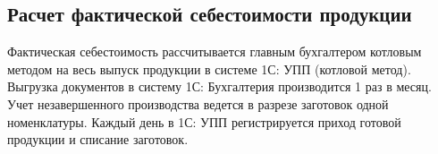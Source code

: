  \newpage
\subsection{Расчет фактической себестоимости продукции}
Фактическая себестоимость рассчитывается главным бухгалтером котловым методом на весь выпуск продукции в системе 1С: УПП (котловой метод). Выгрузка документов в систему 1С: Бухгалтерия производится 1 раз в месяц.
Учет незавершенного производства ведется в разрезе заготовок одной номенклатуры.
Каждый день в 1С: УПП регистрируется приход готовой продукции и списание заготовок.  
